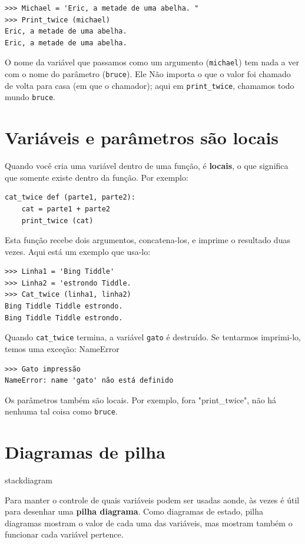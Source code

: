 \documentclass[10pt]{book}
\begin{document}
\begin{exercise}
\begin{verbatim}
>>> Michael = 'Eric, a metade de uma abelha. "
>>> Print_twice (michael)
Eric, a metade de uma abelha.
Eric, a metade de uma abelha.
\end{verbatim}
%
O nome da variável que passamos como um argumento ({\tt michael}) tem
nada a ver com o nome do parâmetro ({\tt bruce}). Ele
Não importa o que o valor foi chamado de volta para casa (em que o chamador);
aqui em \verb "print_twice", chamamos todo mundo {\tt bruce}.


\section {Variáveis ​​e parâmetros são locais}

Quando você cria uma variável dentro de uma função, é {\bf locais},
o que significa que somente
existe dentro da função. Por exemplo:

\begin{verbatim}
cat_twice def (parte1, parte2):
    cat = parte1 + parte2
    print_twice (cat)
\end{verbatim}
%
Esta função recebe dois argumentos, concatena-los, e imprime
o resultado duas vezes. Aqui está um exemplo que usa-lo:

\begin{verbatim}
>>> Linha1 = 'Bing Tiddle'
>>> Linha2 = 'estrondo Tiddle.
>>> Cat_twice (linha1, linha2)
Bing Tiddle Tiddle estrondo.
Bing Tiddle Tiddle estrondo.
\end{verbatim}
%
Quando \verb "cat_twice" termina, a variável {\tt gato}
é destruído. Se tentarmos imprimi-lo, temos uma exceção:
\index{} NameError

\begin{verbatim}
>>> Gato impressão
NameError: name 'gato' não está definido
\end{verbatim}
%
Os parâmetros também são locais.
Por exemplo, fora \verbo "print_twice", não há nenhuma
tal coisa como {\tt bruce}.


\section{Diagramas de pilha}
\label{} stackdiagram

Para manter o controle de quais variáveis ​​podem ser usadas aonde, às vezes é
útil para desenhar uma {\bf pilha diagrama}. Como diagramas de estado, pilha
diagramas mostram o valor de cada uma das variáveis, mas mostram também o
funcionar cada variável pertence.


\end{exercise}
\end{document}
